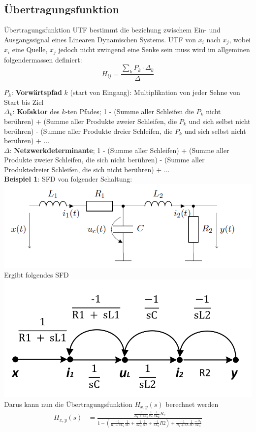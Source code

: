 \subsection{Übertragungsfunktion}
Übertragungsfunktion UTF bestimmt die beziehung zwischem Ein- und Ausgangssignal eines Linearen Dynamischen Systems. UTF von $x_i$ nach $x_j$, wobei $x_i$ eine Quelle, $x_j$ jedoch nicht zwingend eine Senke sein muss wird im allgeminen folgendermassen definiert:
\[
H_{ij} = \frac{\sum_{k} P_{k}\cdot \Delta_k}{\Delta}
\]

\noindent$P_k$: \textbf{Vorwärtspfad} $k$ (start von Eingang): Multiplikation von jeder Sehne von Start bis Ziel\\
$\Delta_k$: \textbf{Kofaktor} des $k$-ten Pfades; 1 - (Summe aller Schleifen die $P_k$ nicht berühren) + (Summe aller Produkte zweier Schleifen, die $P_k$ und sich selbst nicht berühren) - (Summe aller Produkte dreier Schleifen, die $P_k$ und sich selbst nicht berühren) + $\dots$\\
$\Delta$: \textbf{Netzwerkdeterminante}; 1 - (Summe aller Schleifen) + (Summe aller Produkte zweier Schleifen, die sich nicht berühren) - (Summe aller Produktedreier Schleifen, die sich nicht berühren) + $\dots$\\

\noindent\textbf{Beispiel 1}:
SFD von folgender Schaltung:\\
\includegraphics[width=\columnwidth]{Images/sfd_beispiel_adv}
Ergibt folgendes SFD\\
\includegraphics[width=\columnwidth]{Images/sfd_beispiel_adv1}
Darus kann nun die Übertragungsfunktion $H_{x,y}(s)$ berechnet werden
\begin{align*}
	H_{x,y}(s) &= \frac{\frac{1}{R_1+sL_1} \frac{1}{sC}\frac{1}{sL_2}R_2}{1-\left(\frac{-1}{R_1+sL_1}\frac{1}{sC}+\frac{-1}{sL_2}\frac{1}{sC}+\frac{-1}{sL_2}R2\right)+\frac{-1}{R_1+sL}\frac{1}{sC}\frac{-R_2}{sL_2}}
\end{align*}

